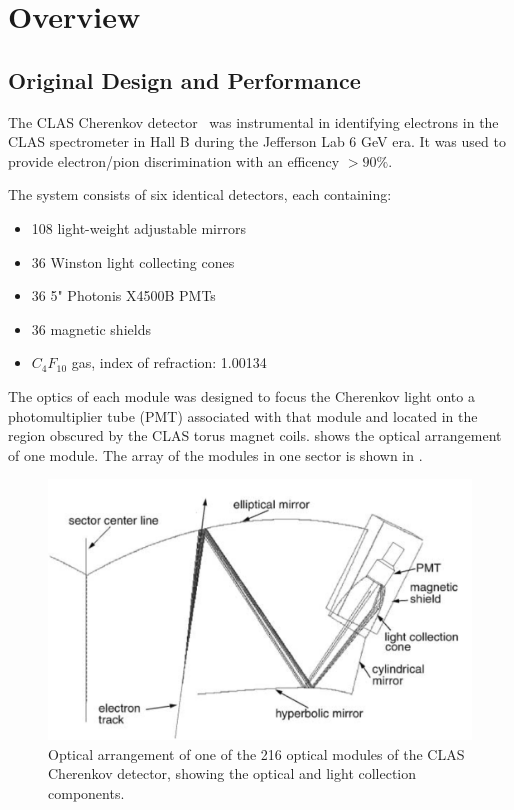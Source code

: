 \section{Overview}



\subsection{Original Design and Performance}

The CLAS Cherenkov detector~\cite{Adams:2001kk} was instrumental in identifying electrons in the CLAS spectrometer in Hall B during the Jefferson Lab 6 GeV era.
It was used to provide electron/pion discrimination with an efficency $ > 90\%$.

The system consists of six identical detectors, each containing:

\begin{itemize}
	\item 108 light-weight adjustable mirrors
	\item 36 Winston light collecting cones
	\item 36 5" Photonis X4500B PMTs
	\item 36 magnetic shields
	\item $C_4F_{10}$ gas, index of refraction: 1.00134
\end{itemize}


The optics of each module was designed to focus the Cherenkov light onto a photomultiplier tube (PMT) associated with that module and located in the region
obscured by the CLAS torus magnet coils.
 shows the optical arrangement of one module. The array of the modules in one sector is shown in .

\begin{figure}[ht]
	\centering
	\includegraphics[width=1.0\columnwidth,keepaspectratio]{img/optics.png}
	\caption{Optical arrangement of one of the 216 optical modules of the CLAS Cherenkov detector, showing the optical and light collection components.}
	\label{fig:optics}
\end{figure}

